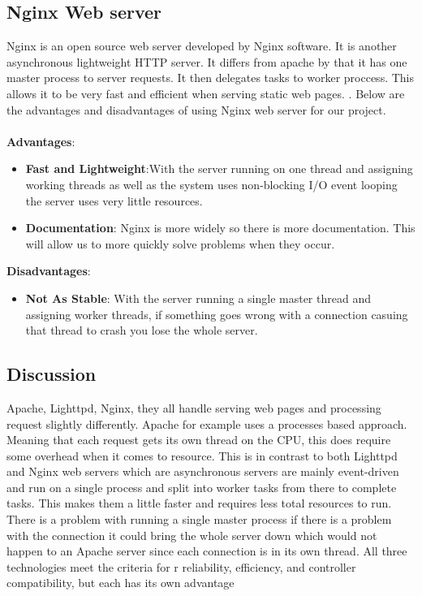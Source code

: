 \documentclass[onecolumn, draftclsnofoot,10pt, compsoc]{IEEEtran}
\begin{document}
		\subsection{Nginx Web server}
		Nginx is an open source web server developed by Nginx software. It is another
		asynchronous lightweight HTTP server. It differs from apache by that it has
		one master process to server requests. It then delegates tasks to worker
		proccess. This allows it to be very fast and efficient when serving static
		web pages. \cite{Nginx}. Below are the advantages and disadvantages
		of using Nginx web server for our project.
		\\\\
		\textbf{Advantages}:
		\begin{itemize}
			\item \textbf{Fast and Lightweight}:With the server running on one thread
			and assigning working threads as well as the system uses non-blocking I/O
			event looping the server uses very little resources.
			\item \textbf{Documentation}: Nginx is more widely so there is more documentation.
			This will allow us to more quickly solve problems when they occur.
		\end{itemize}
		\noindent\textbf{Disadvantages}:
		\begin{itemize}
			\item \textbf{Not As Stable}: With the server running a single master thread
			and assigning worker threads, if something goes wrong with a connection casuing
			that thread to crash you lose the whole server.
		\end{itemize}
		\subsection{Discussion}
	 	Apache, Lighttpd, Nginx, they all handle serving web pages and processing
		request slightly differently. Apache for example uses a processes based approach.
	 	Meaning that each request gets its own thread on the CPU, this does require
		some overhead when it comes to resource. This is in contrast to both Lighttpd
		and Nginx web servers which are asynchronous servers are mainly event-driven
		and run on a single process and split into worker tasks from there to complete
		tasks. This makes them a little faster and requires less total resources to run.
		There is a problem with running a single master process if there is a problem
		with the connection it could bring the whole server down which would not happen to an Apache server since each
		connection is in its own thread. All three technologies meet the criteria for r
		reliability, efficiency, and controller compatibility, but each has its own
		advantage
\end{document}
